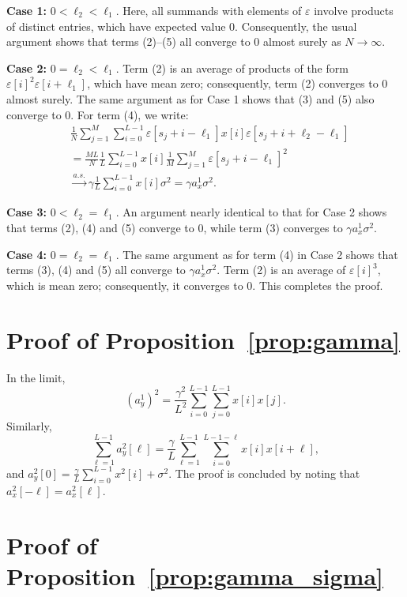 \documentclass[12pt]{article}
\newcommand{\ep}{\varepsilon}
\newcommand{\1}{\mathbf{1}}
\theoremstyle{plain}
\theoremstyle{definition}
\theoremstyle{remark}
\theoremstyle{plain}
\theoremstyle{remark}
\theoremstyle{plain}
\theoremstyle{plain}
\begin{document}
{\bf Case 1:} $0 < \ell_2 < \ell_1$. Here, all summands with elements of $\ep$ involve products of distinct entries, which have expected value 0. Consequently, the usual argument shows that terms (2)--(5) all converge to 0 almost surely as $N \to \infty$.

{\bf Case 2:} $0=\ell_2 < \ell_1$. Term (2) is an average of products of the form $\ep[i]^2\ep[i+\ell_1]$, which have mean zero; consequently, term (2) converges to 0 almost surely. The same argument as for Case 1 shows that (3) and (5) also converge to 0. For term (4), we write:
%
\begin{align*}
%
&\frac{1}{N}\sum_{j=1}^{M} 
\sum_{i=0}^{L-1} \ep[s_j+i-\ell_1]x[i]\ep[s_j+ i+\ell_2-\ell_1]
\nonumber \\
&= \frac{ML}{N}\frac{1}{L}\sum_{i=0}^{L-1}x[i] \frac{1}{M}\sum_{j=1}^{M} \ep[s_j+i-\ell_1]^2
\\& \xrightarrow{a.s.} \gamma \frac{1}{L} \sum_{i=0}^{L-1}x[i] \sigma^2 = \gamma a_x^1 \sigma^2. \nonumber
%
\end{align*}

{\bf Case 3:} $0<\ell_2 = \ell_1$. An argument nearly identical to that for Case 2 shows that terms (2), (4) and (5) converge to 0, while term (3) converges to $\gamma a_x^1 \sigma^2$.

{\bf Case 4:} $0=\ell_2 = \ell_1$. The same argument as for term (4) in Case 2 shows that terms (3), (4) and (5) all converge to $\gamma a_x^1 \sigma^2$. Term (2) is an average of $\ep[i]^3$, which is mean zero; consequently, it converges to 0.
This completes the proof.


\section{Proof of Proposition~\ref{prop:gamma}} \label{sec:proof_prop_gamma}

In the limit, 
\begin{equation*}
(a^1_y)^2=\frac{\gamma^2}{L^2}\sum_{i=0}^{L-1}\sum_{j=0}^{L-1}x[i]x[j].
\end{equation*}
Similarly,  
\begin{equation*}
\sum_{\ell = 1}^{L-1}a_y^2[\ell]=\frac{\gamma}{L}\sum_{\ell = 1}^{L-1}\sum_{i=0}^{L-1-\ell}x[i]x[i+\ell],
\end{equation*}
and $a_y^2[0]=\frac{\gamma}{L}\sum_{i=0}^{L-1}x^2[i] + \sigma^2$. The proof is concluded by noting that  $a_x^2[-\ell]=a_x^2[\ell]$. 


\section{Proof of Proposition~\ref{prop:gamma_sigma}} \label{sec:proof_prop_gamma_sigma}
\end{document}
